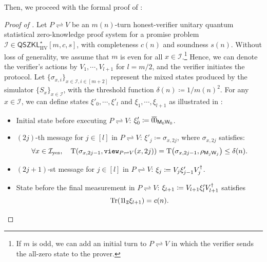 \documentclass[10pt,a4paper]{article}
\numberwithin{equation}{section}
\numberwithin{figure}{section}
\newcommand{\QSZKLstar}{\mathsf{QSZKL}^{\star}_{\mathrm{HV}}}
\newcommand{\view}[2]{\mathtt{view}_{{#1}\rightleftharpoons{#2}}}
\newcommand{\protocol}[2]{{#1}\!\rightleftharpoons\!{#2}}
\DeclarePairedDelimiter\rbra{\lparen}{\rparen}
\let\ket\relax\DeclarePairedDelimiter\ket{\lvert}{\rangle}
\let\bra\relax\DeclarePairedDelimiter\bra{\langle}{\rvert}
\newcommand{\ketbra}[2]{\ensuremath{\ket{#1}\!\bra{#2}}}
\newcommand{\Tr}{\mathrm{Tr}}
\newcommand{\td}{\mathrm{T}}
\newcommand{\yes}{{\rm yes}}
\newcommand{\calI}{\mathcal{I}}
\newcommand{\sfM}{\mathsf{M}}
\newcommand{\sfW}{\mathsf{W}}
\newcommand{\ttZ}{\mathtt{Z}}
\begin{document}
Then, we proceed with the formal proof of :
\begin{proof}[Proof of ]
    Let $\protocol{P}{V}$ be an $m(n)$-turn honest-verifier unitary quantum statistical zero-knowledge proof system for a promise problem $\calI \in\QSZKLstar[m,c,s]$, with completeness $c(n)$ and soundness $s(n)$. Without loss of generality, we assume that $m$ is even for all $x\in \calI$.\footnote{If $m$ is odd, we can add an initial turn to $\protocol{P}{V}$ in which the verifier sends the all-zero state to the prover.\label{footref:dummy-message}} Hence, we can denote the verifier's actions by $V_1,\cdots,V_{l+1}$ for $l=m/2$, and the verifier initiates the protocol. Let $\{\sigma_{x,i}\}_{x\in\calI,i\in[m+2]}$ represent the mixed states produced by the simulator $\{S_x\}_{x\in\calI}$, with the threshold function $\delta(n) \coloneqq 1/m(n)^2$. For any $x\in \calI$, we can define states $\xi'_0,\cdots,\xi'_l$ and $\xi_1,\cdots,\xi_{l+1}$ as illustrated in : 
    \begin{itemize}[itemsep=0.33em, topsep=0.33em, parsep=0.33em]
        \item Initial state before executing $\protocol{P}{V}$: $\xi'_0 \coloneqq \ketbra{\bar{0}}{\bar{0}}_{\sfM_0\sfW_0}$. 
        \item $(2j)$-th message for $j\in[l]$ in $\protocol{P}{V}$: $\xi'_j \coloneqq \sigma_{x,2j}$, where $\sigma_{x,2j}$ satisfies:
        \begin{equation}
            \label{eq:simulator-distance-bounds}
            \forall x\in \calI_\yes, \quad \td\rbra*{\sigma_{x,2j-1},\view{P}{V}(x,2j)} = \td\rbra*{\sigma_{x,2j-1},\rho_{\sfM_j\sfW_j}} \leq \delta(n).
        \end{equation}
        \item $(2j+1)$-st message for $j\in[l]$ in $\protocol{P}{V}$: $\xi_j \coloneqq V_j \xi'_{j-1} \smash{V_j^{\dagger}}$.
        \item State before the final measurement in $\protocol{P}{V}$: $\xi_{l+1} \coloneqq V_{l+1} \xi'_l \smash{V_{l+1}^{\dagger}}$ satisfies 
        \[\Tr\rbra*{\ketbra{1}{1}_{\ttZ} \xi_{l+1}}=c(n).\] 
    \end{itemize}


\end{proof}
\end{document}
